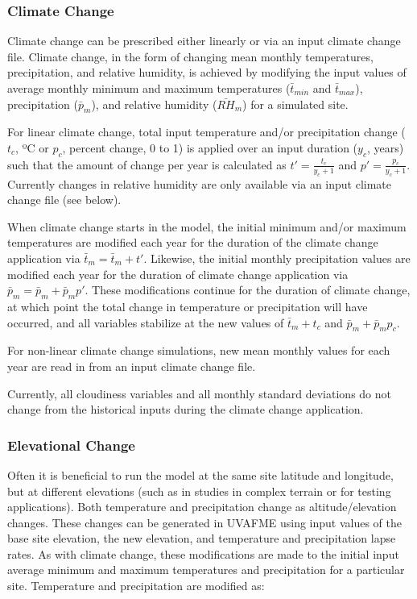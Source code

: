 \documentclass[a4paper, 12pt] {report}
\begin{document}
\subsubsection{Climate Change}
Climate change can be prescribed either linearly or via an input climate change file. Climate change, in the form of changing mean monthly temperatures, precipitation, and relative humidity, is achieved by modifying the input values of average monthly minimum and maximum temperatures ($\bar{t}_{min}$ and $\bar{t}_{max}$), precipitation ($\bar{p}_m$), and relative humidity ($\bar{RH}_m$) for a simulated site. 

For linear climate change, total input temperature and/or precipitation change ($t_c$, ºC or $p_c$, percent change, 0 to 1) is applied over an input duration ($y_c$, years) such that the amount of change per year is calculated as $t' = \frac{t_c}{y_c + 1}$ and $p' = \frac{p_c}{y_c + 1}$. Currently changes in relative humidity are only available via an input climate change file (see below). 

When climate change starts in the model, the initial minimum and/or maximum temperatures are modified each year for the duration of the climate change application via $\bar{t}_m = \bar{t}_m + t'$. Likewise, the initial monthly precipitation values are modified each year for the duration of climate change application via $\bar{p}_m = \bar{p}_m + \bar{p}_mp'$. These modifications continue for the duration of climate change, at which point the total change in temperature or precipitation will have occurred, and all variables stabilize at the new values of $\bar{t}_m + t_c$ and $\bar{p}_m + \bar{p}_mp_c$.

For non-linear climate change simulations, new mean monthly values for each year are read in from an input climate change file.

Currently, all cloudiness variables and all monthly standard deviations do not change from the historical inputs during the climate change application.

\subsubsection{Elevational Change}
Often it is beneficial to run the model at the same site latitude and longitude, but at different elevations (such as in studies in complex terrain or for testing applications). Both temperature and precipitation change as altitude/elevation changes. These changes can be generated in UVAFME using input values of the base site elevation, the new elevation, and temperature and precipitation lapse rates. As with climate change, these modifications are made to the initial input average minimum and maximum temperatures and precipitation for a particular site. Temperature and precipitation are modified as:
\end{document}
